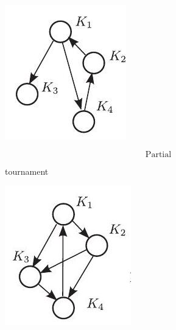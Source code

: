 \documentclass[10pt]{article}
\begin{document}
\begin{center}
\includegraphics[max width=\textwidth]{2024_01_11_fda3c6ffd32dd805faacg-3(2)}
\end{center}

$$
\text { Partial }
$$

tournament

\begin{center}
\includegraphics[max width=\textwidth]{2024_01_11_fda3c6ffd32dd805faacg-3(3)}
\end{center}
\end{document}
